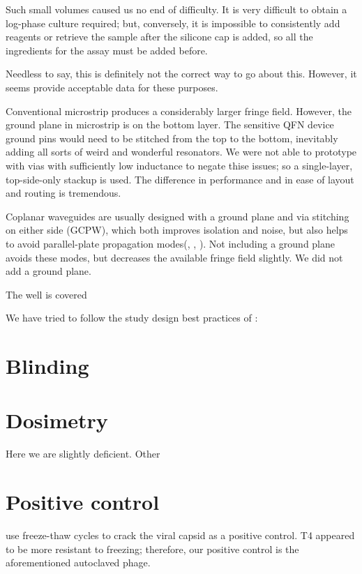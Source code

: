 \documentclass[paper.tex]{subfiles}
\begin{document}
Such small volumes caused us no end of difficulty. It is very difficult to obtain a log-phase culture required; but, conversely, it is impossible to consistently add reagents or retrieve the sample after the silicone cap is added, so all the ingredients for the assay must be added before.

Needless to say, this is definitely not the correct way to go about this. However, it seems provide acceptable data for these purposes.

Conventional microstrip produces a considerably larger fringe field. However, the ground plane in microstrip is on the bottom layer. The sensitive QFN device ground pins would need to be stitched from the top to the bottom, inevitably adding all sorts of weird and wonderful resonators.
We were not able to prototype with vias with sufficiently low inductance to negate thise issues; so a single-layer, top-side-only stackup is used. The difference in performance and in ease of layout and routing is tremendous.

Coplanar waveguides are usually designed with a ground plane and via stitching on either side (GCPW), which both improves isolation and noise, but also helps to avoid parallel-plate propagation modes(\cite{Microwaves101c}, \cite{Propagation1990}, \cite{Characteristics1997}). Not including a ground plane avoids these modes, but decreases the available fringe field slightly. We did not add a ground plane.

The well is covered





We have tried to follow the study design best practices of \cite{Biological2016}:

\section{Blinding}



\section{Dosimetry}

Here we are slightly deficient. Other

\section{Positive control}

\cite{Efficient2015} use freeze-thaw cycles to crack the viral capsid as a positive control.
T4 appeared to be more resistant to freezing; therefore, our positive control is the aforementioned autoclaved phage.
\end{document}
